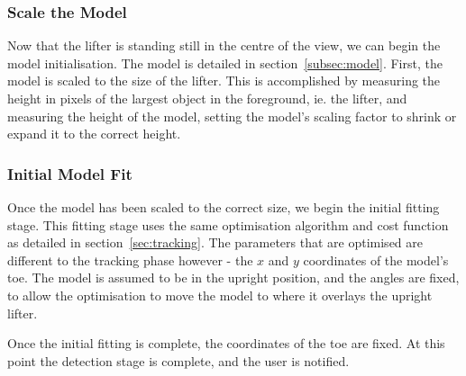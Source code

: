 \subsubsection{Scale the Model}
Now that the lifter is standing still in the centre of the view, we can begin the model initialisation. The model is detailed in section~\ref{subsec:model}. First, the model is scaled to the size of the lifter. This is accomplished by measuring the height in pixels of the largest object in the foreground, ie. the lifter, and measuring the height of the model, setting the model's scaling factor to shrink or expand it to the correct height.

\subsubsection{Initial Model Fit}
Once the model has been scaled to the correct size, we begin the initial fitting stage. This fitting stage uses the same optimisation algorithm and cost function as detailed in section~\ref{sec:tracking}. The parameters that are optimised are different to the tracking phase however - the $x$ and $y$ coordinates of the model's toe. The model is assumed to be in the upright position, and the angles are fixed, to allow the optimisation to move the model to where it overlays the upright lifter.

Once the initial fitting is complete, the coordinates of the toe are fixed. At this point the detection stage is complete, and the user is notified.